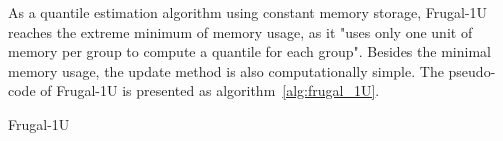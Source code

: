 As a quantile estimation algorithm using constant memory storage, Frugal-1U reaches the extreme minimum of memory usage, as it "uses only one unit of memory per group to compute a quantile for each group"\cite{maFrugalStreamingEstimating2014}. Besides the minimal memory usage, the update method is also computationally simple. The pseudo-code of Frugal-1U is presented as algorithm~\ref{alg:frugal_1U}.
\begin{algorithm}
\caption{Frugal-1U}\label{alg:frugal_1U}
    \begin{algorithmic}[1]
                \EndIf
            \EndFor
    \end{algorithmic}
\end{algorithm}

